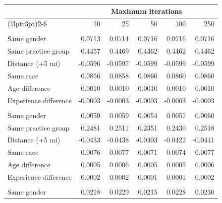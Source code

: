 \begin{tabular}{lrrrrr}
\toprule
\multicolumn{1}{c}{ } & \multicolumn{5}{c}{Maximum iterations} \\
\cmidrule(l{3pt}r{3pt}){2-6}
 & 10 & 25 & 50 & 100 & 250\\
\midrule
\addlinespace[0.5em]
\multicolumn{6}{l}{\textbf{Orthopedic Surgery}}\\
\hspace{1em}Same gender & 0.0713 & 0.0714 & 0.0716 & 0.0716 & 0.0716\\
\hspace{1em}Same practice group & 0.4457 & 0.4469 & 0.4462 & 0.4462 & 0.4462\\
\hspace{1em}Distance (+5 mi) & -0.0596 & -0.0597 & -0.0599 & -0.0599 & -0.0599\\
\hspace{1em}Same race & 0.0856 & 0.0858 & 0.0860 & 0.0860 & 0.0860\\
\hspace{1em}Age difference & 0.0010 & 0.0010 & 0.0010 & 0.0010 & 0.0010\\
\hspace{1em}Experience difference & -0.0003 & -0.0003 & -0.0003 & -0.0003 & -0.0003\\
\addlinespace[0.5em]
\multicolumn{6}{l}{\textbf{Cardiology}}\\
\hspace{1em}Same gender & 0.0059 & 0.0059 & 0.0054 & 0.0057 & 0.0060\\
\hspace{1em}Same practice group & 0.2481 & 0.2511 & 0.2351 & 0.2430 & 0.2518\\
\hspace{1em}Distance (+5 mi) & -0.0433 & -0.0438 & -0.0403 & -0.0422 & -0.0441\\
\hspace{1em}Same race & 0.0076 & 0.0077 & 0.0071 & 0.0074 & 0.0077\\
\hspace{1em}Age difference & 0.0005 & 0.0006 & 0.0005 & 0.0005 & 0.0006\\
\hspace{1em}Experience difference & 0.0002 & 0.0002 & 0.0001 & 0.0001 & 0.0002\\
\addlinespace[0.5em]
\multicolumn{6}{l}{\textbf{Dermatology}}\\
\hspace{1em}Same gender & 0.0218 & 0.0229 & 0.0215 & 0.0228 & 0.0230\\

\end{tabular}
